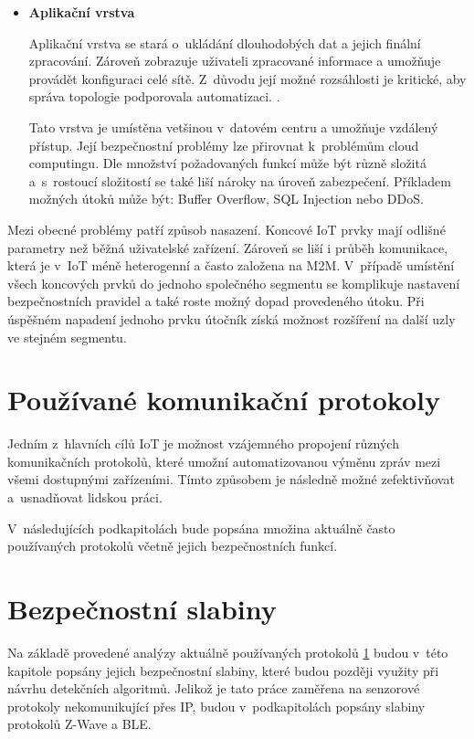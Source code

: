 \begin{itemize}
 \newpage
 \item \textbf{Aplikační vrstva}
 
 Aplikační vrstva se stará o~ukládání dlouhodobých dat a jejich finální zpracování. 
 Zároveň zobrazuje uživateli zpracované informace a umožňuje provádět konfiguraci
 celé sítě. Z~důvodu její možné rozsáhlosti je kritické, aby správa
 topologie podporovala automatizaci. \cite{secFramework}.
 
 Tato vrstva je umístěna vetšinou v~datovém centru a umožňuje vzdálený přístup. 
 Její bezpečnostní problémy lze přirovnat k~problémům cloud computingu. Dle
 množství požadovaných funkcí může být různě složitá a~s~rostoucí složitostí
 se také liší nároky na úroveň zabezpečení. Příkladem možných útoků může být:
 Buffer Overflow, SQL Injection nebo DDoS.
 
\end{itemize}

Mezi obecné problémy patří způsob nasazení. Koncové IoT prvky mají odlišné parametry než 
běžná uživatelské zařízení. Zároveň se liší i průběh komunikace, která je v~IoT méně heterogenní
a často založena na M2M. V~případě umístění všech koncových prvků do jednoho společného segmentu
se komplikuje nastavení bezpečnostních pravidel a také roste možný dopad provedeného útoku. 
Při úspěšném napadení jednoho prvku útočník získá možnost rozšíření na další uzly ve stejném
segmentu.

 
 \newpage
 
 \section{Používané komunikační protokoly} \label{protokoly}
 Jedním z~hlavních cílů IoT je možnost vzájemného propojení různých komunikačních protokolů, 
 které umožní automatizovanou výměnu zpráv mezi všemi dostupnými zařízeními. Tímto způsobem
 je následně možné zefektivňovat a~usnadňovat lidskou práci.
 
 V~následujících podkapitolách bude popsána množina aktuálně často používaných protokolů
 včetně jejich bezpečnostních funkcí.
 
  
   
   \newpage
  \section{Bezpečnostní slabiny}
  Na základě provedené analýzy aktuálně používaných protokolů \ref{protokoly} budou v~této kapitole 
  popsány jejich bezpečnostní slabiny, které budou později využity při návrhu 
  detekčních algoritmů. Jelikož je tato práce zaměřena na senzorové protokoly 
  nekomunikující přes IP, budou v~podkapitolách popsány slabiny protokolů 
  Z-Wave a BLE.
  
